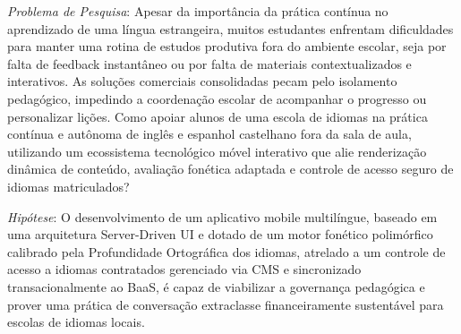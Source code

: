 \documentclass[portuguese]{sbcreviews-2025}%
\begin{document}
\textit{Problema de Pesquisa}: Apesar da importância da prática contínua no aprendizado de uma língua estrangeira, muitos estudantes enfrentam dificuldades para manter uma rotina de estudos produtiva fora do ambiente escolar, seja por falta de feedback instantâneo ou por falta de materiais contextualizados e interativos. As soluções comerciais consolidadas pecam pelo isolamento pedagógico, impedindo a coordenação escolar de acompanhar o progresso ou personalizar lições. Como apoiar alunos de uma escola de idiomas na prática contínua e autônoma de inglês e espanhol castelhano fora da sala de aula, utilizando um ecossistema tecnológico móvel interativo que alie renderização dinâmica de conteúdo, avaliação fonética adaptada e controle de acesso seguro de idiomas matriculados?

\textit{Hipótese}: O desenvolvimento de um aplicativo mobile multilíngue, baseado em uma arquitetura Server-Driven UI e dotado de um motor fonético polimórfico calibrado pela Profundidade Ortográfica dos idiomas, atrelado a um controle de acesso a idiomas contratados gerenciado via CMS e sincronizado transacionalmente ao BaaS, é capaz de viabilizar a governança pedagógica e prover uma prática de conversação extraclasse financeiramente sustentável para escolas de idiomas locais.
\end{document}

